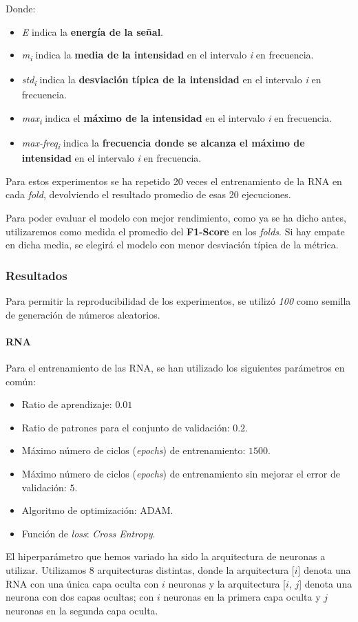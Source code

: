 \documentclass[12pt]{article}
\begin{document}
\newpage
\hphantom{skip}
\newpage
Donde:
\begin{itemize}
	\item \textit{E} indica la \textbf{energía de la señal}.
	\item \textit{m\textsubscript{i}} indica la \textbf{media de la intensidad} en el intervalo \textit{i} en frecuencia.
	\item \textit{std\textsubscript{i}} indica la \textbf{desviación típica de la intensidad} en el intervalo \textit{i} en frecuencia.
	\item \textit{max\textsubscript{i}} indica el \textbf{máximo de la intensidad} en el intervalo \textit{i} en frecuencia.
	\item \textit{max-freq\textsubscript{i}} indica la \textbf{frecuencia donde se alcanza el máximo de intensidad} en el intervalo \textit{i} en frecuencia.
\end{itemize}

Para estos experimentos se ha repetido 20 veces el entrenamiento de la RNA en cada \textit{fold}, devolviendo el resultado promedio de esas 20 ejecuciones.

\bigskip
Para poder evaluar el modelo con mejor rendimiento, como ya se ha dicho antes, utilizaremos como medida el promedio
del \textbf{F1-Score} en los \textit{folds}. Si hay empate en dicha media, se elegirá el modelo con menor
desviación típica de la métrica.


\newpage
\subsubsection{Resultados}
Para permitir la reproducibilidad de los experimentos, se utilizó \textit{100} como semilla de generación de números
aleatorios.

\paragraph{RNA}

Para el entrenamiento de las RNA, se han utilizado los siguientes parámetros en común:
\begin{itemize}
	\item Ratio de aprendizaje: $0.01$
	\item Ratio de patrones para el conjunto de validación: $0.2$.
	\item Máximo número de ciclos (\textit{epochs}) de entrenamiento: $1500$.
	\item Máximo número de ciclos (\textit{epochs}) de entrenamiento sin mejorar el error de validación: $5$.
	\item Algoritmo de optimización: ADAM.
	\item Función de \textit{loss}: \textit{Cross Entropy}.
\end{itemize}
El hiperparámetro que hemos variado ha sido la arquitectura de neuronas a utilizar. Utilizamos 8 arquitecturas distintas,
donde la arquitectura [$i$] denota una RNA con una única capa oculta con $i$ neuronas y la arquitectura [$i$, $j$] 
denota una neurona con dos capas ocultas; con $i$ neuronas en la primera capa oculta y $j$ neuronas en la segunda capa oculta.
\end{document}

